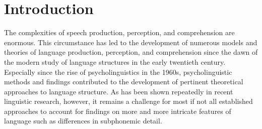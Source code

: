 \chapter{Introduction}\label{chapter01}

The complexities of speech production, perception, and comprehension are enormous. This circumstance has led to the development of numerous models and theories of language production, perception, and comprehension since the dawn of the modern study of language structures in the early twentieth century. Especially since the rise of psycholinguistics in the 1960s, psycholinguistic methods and findings contributed to the development of pertinent theoretical approaches to language structure. As has been shown repeatedly in recent linguistic research, however, it remains a challenge for most if not all established approaches to account for findings on more and more intricate features of language such as differences in subphonemic detail.

